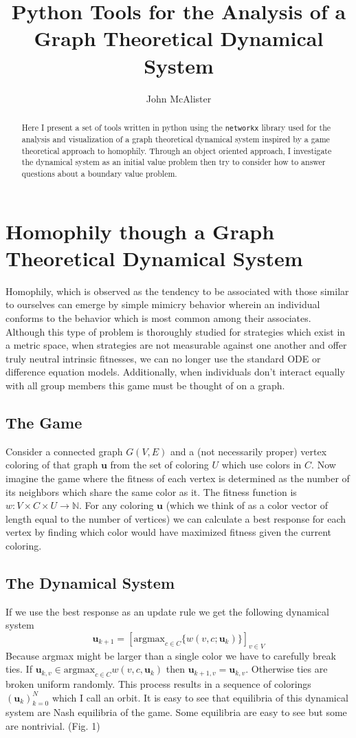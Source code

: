 \documentclass[]{article}
\title{Python Tools for the Analysis of a Graph Theoretical Dynamical System}
\author{John McAlister}
\begin{document}
\maketitle

\begin{abstract}
Here I present a set of tools written in python using the \verb*|networkx| library used for the analysis and visualization of a graph theoretical dynamical system inspired by a game theoretical approach to homophily. Through an object oriented approach, I investigate the dynamical system as an initial value problem then try to consider how to answer questions about a boundary value problem.
\end{abstract}

\section{Homophily though a Graph Theoretical Dynamical System}
Homophily, which is observed as the tendency to be associated with those similar to ourselves can emerge by simple mimicry behavior wherein an individual conforms to the behavior which is most common among their associates. Although this type of problem is thoroughly studied for strategies which exist in a metric space, when strategies are not measurable against one another and offer truly neutral intrinsic fitnesses, we can no longer use the standard ODE or difference equation models. Additionally, when individuals don't interact equally with all group members this game must be thought of on a graph. 
\subsection{The Game}
	Consider a connected graph $G(V,E)$ and a (not necessarily proper) vertex coloring of that graph $\mathbf{u}$ from the set of coloring $U$ which use colors in $C$. Now imagine the game where the fitness of each vertex is determined as the number of its neighbors which share the same color as it. The fitness function is $w:V\times C\times U\rightarrow \mathbb{N}$.
	For any coloring $\mathbf{u}$ (which we think of as a color vector of length equal to the number of vertices) we can calculate a best response for each vertex by finding which color would have maximized fitness given the current coloring. 
\subsection{The Dynamical System}
	If we use the best response as an update rule we get the following dynamical system
\begin{equation}
	\mathbf{u}_{k+1}=[\text{argmax}_{c\in C}\{w(v,c;\mathbf{u}_k)\} ]_{v\in V}
\end{equation}
Because argmax might be larger than a single color we have to carefully break ties. If $\mathbf{u}_{k,v}\in \text{argmax}_{c\in C}{w(v,c,\mathbf{u}_k)}$ then $\mathbf{u}_{k+1,v}=\mathbf{u}_{k,v}$. Otherwise ties are broken uniform randomly. This process results in a sequence of colorings $(\mathbf{u}_k)_{k=0}^N$ which I call an orbit. It is easy to see that equilibria of this dynamical system are Nash equilibria of the game. Some equilibria are easy to see but some are nontrivial. (Fig. 1)
\end{document}
